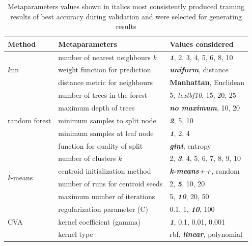 \documentclass[12pt]{article}
\begin{document}
\begin{table} %
  \small
  \begin{center}
  \vspace{-4\baselineskip} %
  \setlength{\abovecaptionskip}{5pt}
  \setlength{\belowcaptionskip}{5pt}
  \fontsize{10}{10}\selectfont %
  \begin{tabular}{l|l|l}
  Method & Metaparameters & Values considered\\
  \hline
  \multirow{3}{*}{\textit{k}nn} & number of nearest neighbours \textit{k}	  & \textit{\textbf{1}}, 2, 3, 4, 5, 6, 8, 10 \\
                            & weight function for prediction	& \textit{\textbf{uniform}}, distance \\
                        & distance metric for neighbours	& \textbf{Manhattan}, Euclidean \\
  \hline
  \multirow{5}{*}{random forest} & number of trees in the forest & 5, \textit{textbf{10}}, 15, 20, 25 \\
                                 & maximum depth of trees	         & \textit{\textbf{no maximum}}, 10, 20 \\
                                 & minimum samples to split node	 & \textit{\textbf{2}}, 5, 10 \\
                                 & minimum samples at leaf node    & \textit{\textbf{1}}, 2, 4 \\
                                 & function for quality of split   & \textit{\textbf{gini}}, entropy \\
  \hline
  \multirow{4}{*}{\textit{k}-means} & number of clusters \textit{k}  & 2, \textit{\textbf{3}}, 4, 5, 6, 7, 8, 9, 10 \\
                              & centroid initialization method         & \textit{\textbf{k-means++}}, random \\
                              & number of runs for centroid seeds	     & 2, \textit{\textbf{5}}, 10, 20 \\
                              & maximum number of iterations           & 5, \textit{\textbf{10}}, 20, 50 \\
  \hline
    \multirow{3}{*}{CVA} & regularization parameter (C)  & 0.1, 1, \textit{\textbf{10}}, 100 \\
                          & kernel coefficient (gamma)   & \textit{\textbf{1}}, 0.1, 0.01, 0.001 \\
                          & kernel type                  & rbf, \textit{\textbf{linear}}, polynomial \\
  \hline
  \end{tabular}
  \vspace{-1.5\baselineskip} %
  \end{center} 
  \caption{Metaparameters values shown in italics most consistently produced training results of 
  best accuracy during validation and were selected for generating results}
  \vspace{-1\baselineskip} %
  \label{tab:metaparameters}
\end{table} 
\end{document}

